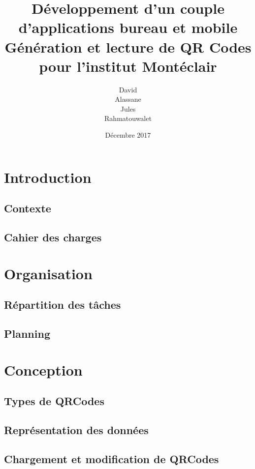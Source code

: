 \documentclass{report}
\title{%
		Développement d'un couple d'applications bureau et mobile\\ \large
		Génération et lecture de QR Codes pour l'institut Montéclair}
\author{David \bsc{Dembele}\\ Alassane \bsc{Diop}\\
		Jules \bsc{Leguy}\\ Rahmatouwalet \bsc{Mohamedoun}}
\date{Décembre 2017}
\begin{document}
\maketitle

\tableofcontents

\chapter{Introduction}

	\section{Contexte}
		
	
	\section{Cahier des charges}
		


\chapter{Organisation}

	\section{Répartition des tâches}
		
	
	\section{Planning}
		
		
		
\chapter{Conception}

	\section{Types de QRCodes}
		
		
	\section{Représentation des données}
		
		
	\section{Chargement et modification de QRCodes}
		
\end{document}
